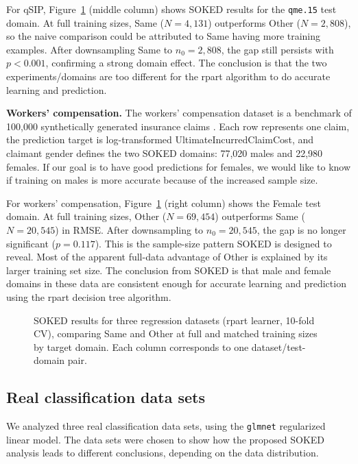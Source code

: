 \documentclass[twoside]{article}
\begin{document}
For qSIP, Figure~\ref{fig:regr-pairs} (middle column) shows SOKED results for the \texttt{qme.15} test domain.
At full training sizes, Same ($N = 4{,}131$) outperforms Other ($N = 2{,}808$), so the naive comparison could be attributed to Same having more training examples.
After downsampling Same to $n_0 = 2{,}808$, the gap still persists with $p < 0.001$, confirming a strong domain effect.
The conclusion is that the two experiments/domains are too different for the rpart algorithm to do accurate learning and prediction.

\textbf{Workers' compensation.}
The workers' compensation dataset is a benchmark of 100,000 synthetically generated insurance claims \citep{Ali2020}.
Each row represents one claim, the prediction target is log-transformed UltimateIncurredClaimCost, and claimant gender defines the two SOKED domains: 77,020 males and 22,980 females.
If our goal is to have good predictions for females, we would like to know if training on males is more accurate because of the increased sample size.

For workers' compensation, Figure~\ref{fig:regr-pairs} (right column) shows the Female test domain.
At full training sizes, Other ($N = 69{,}454$) outperforms Same ($N = 20{,}545$) in RMSE.
After downsampling to $n_0 = 20{,}545$, the gap  is no longer significant ($p = 0.117$).
This is the sample-size pattern SOKED is designed to reveal.
Most of the apparent full-data advantage of Other is explained by its larger training set size.
The conclusion from SOKED is that male and female domains in these data are consistent enough for accurate learning and prediction using the rpart decision tree algorithm.

\begin{figure}[!t]
    \centering
    \def\pairfigure{fig5-regr-pairs.png}
    \def\firstdomain{Phoenix}\def\seconddomain{qme.15}\def\thirddomain{F}
    
    \caption{
    SOKED results for three regression datasets (rpart learner, 10-fold CV), comparing Same and Other at full and matched training sizes by target domain.
    Each column corresponds to one dataset/test-domain pair.}
    \label{fig:regr-pairs}
\end{figure}


\subsection{Real classification data sets}
We analyzed three real classification data sets, using the \texttt{glmnet} regularized linear model.
The data sets were chosen to show how the proposed SOKED analysis leads to different conclusions, depending on the data distribution.
\end{document}
